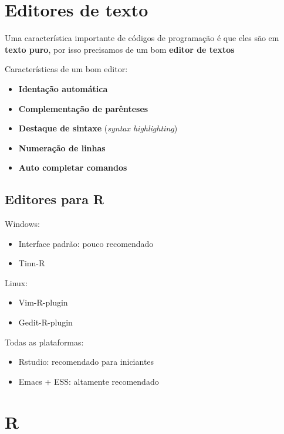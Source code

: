 \documentclass[10pt,a4paper]{book}
\providecommand{\tightlist}{%
  \setlength{\itemsep}{0pt}\setlength{\parskip}{0pt}}
\begin{document}
\section{Editores de texto}\label{editores-de-texto}

Uma característica importante de códigos de programação é que eles são
em \textbf{texto puro}, por isso precisamos de um bom \textbf{editor de
textos}

Características de um bom editor:

\begin{itemize}
\tightlist
\item
  \textbf{Identação automática}
\item
  \textbf{Complementação de parênteses}
\item
  \textbf{Destaque de sintaxe} (\emph{syntax highlighting})
\item
  \textbf{Numeração de linhas}
\item
  \textbf{Auto completar comandos}
\end{itemize}

\subsection{Editores para R}\label{editores-para-r}

Windows:

\begin{itemize}
\tightlist
\item
  Interface padrão: pouco recomendado
\item
  Tinn-R
\end{itemize}

Linux:

\begin{itemize}
\tightlist
\item
  Vim-R-plugin
\item
  Gedit-R-plugin
\end{itemize}

Todas as plataformas:

\begin{itemize}
\tightlist
\item
  Rstudio: recomendado para iniciantes
\item
  Emacs + ESS: altamente recomendado
\end{itemize}

\section{R}\label{r}
\end{document}
